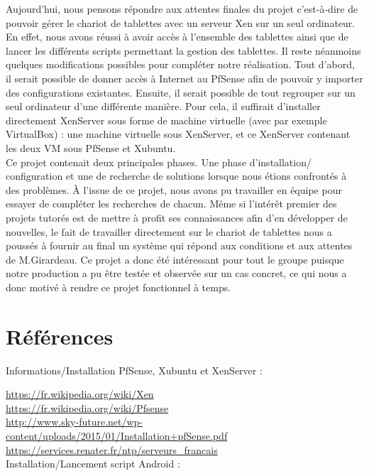 \documentclass[a4paper,12pt]{extarticle}
\begin{document}
Aujourd’hui, nous pensons répondre aux attentes finales du projet c’est-à-dire de pouvoir gérer le chariot de tablettes avec un serveur Xen sur un seul ordinateur. En effet, nous avons réussi à avoir accès à l’ensemble des tablettes ainsi que de lancer les différents scripts permettant la gestion des tablettes.\newline
Il reste néanmoins quelques modifications possibles pour compléter notre réalisation.
Tout d’abord, il serait possible de donner accès à Internet au PfSense afin de pouvoir y importer des configurations existantes. Ensuite, il serait possible de tout regrouper sur un seul ordinateur d’une différente manière. Pour cela, il suffirait d’installer directement XenServer sous forme de machine virtuelle (avec par exemple VirtualBox) : une machine virtuelle sous XenServer, et ce XenServer contenant les deux VM sous PfSense et Xubuntu.\\

Ce projet contenait deux principales phases. Une phase d’installation/ configuration et une de recherche de solutions lorsque nous étions confrontés à des problèmes.
À l’issue de ce projet, nous avons pu travailler en équipe pour essayer de compléter les recherches de chacun. Même si l'intérêt premier des projets tutorés est de mettre à profit ses connaissances afin d’en développer de nouvelles, le fait de travailler directement sur le chariot de tablettes nous a poussés à fournir au final un système qui répond aux conditions et aux attentes de M.Girardeau. Ce projet a donc été intéressant pour tout le groupe puisque notre production a pu être testée et observée sur un cas concret, ce qui nous a donc motivé à rendre ce projet fonctionnel à temps. 

\clearpage
\section{Références}

Informations/Installation PfSense, Xubuntu et XenServer :

\url{https://fr.wikipedia.org/wiki/Xen}\\
\url{https://fr.wikipedia.org/wiki/Pfsense}\\
\url{http://www.sky-future.net/wp-content/uploads/2015/01/Installation+pfSense.pdf}\\
\url{https://services.renater.fr/ntp/serveurs_francais}\\

Installation/Lancement script Android :
\end{document}
